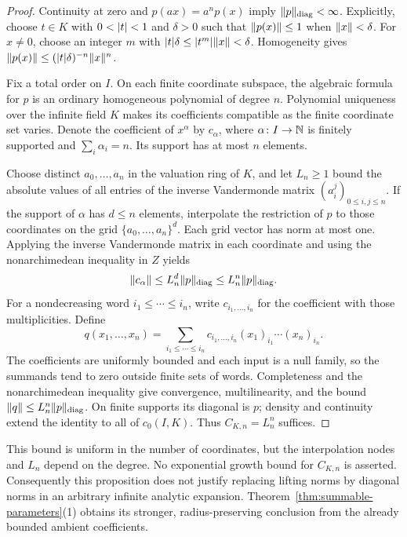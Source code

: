 \begin{proof}
Continuity at zero and $p(ax)=a^np(x)$ imply $\lVert p\rVert_{\mathrm{diag}}<\infty$.
Explicitly, choose $t\in K$ with $0<\lvert t\rvert<1$ and $\delta>0$ such that $\lVert p(x)\rVert\le1$
when $\lVert x\rVert<\delta$. For $x\ne0$, choose an integer $m$ with
$\lvert t\rvert\delta\le\lvert t^m\rvert\lVert x\rVert<\delta$. Homogeneity gives
$\lVert p(x)\rVert\le(\lvert t\rvert\delta)^{-n}\lVert x\rVert^n$.

Fix a total order on $I$. On each finite coordinate subspace, the algebraic formula for $p$ is an
ordinary homogeneous polynomial of degree $n$. Polynomial uniqueness over the infinite field $K$
makes its coefficients compatible as the finite coordinate set varies. Denote the coefficient of
$x^\alpha$ by $c_\alpha$, where $\alpha\colon I\to\mathbb N$ is finitely supported and $\sum_i\alpha_i=n$.
Its support has at most $n$ elements.

Choose distinct $a_0,\ldots,a_n$ in the valuation ring of $K$, and let $L_n\ge1$ bound the absolute
values of all entries of the inverse Vandermonde matrix $(a_i^j)_{0\le i,j\le n}$.
If the support of $\alpha$ has $d\le n$ elements, interpolate the restriction of $p$ to those
coordinates on the grid $\{a_0,\ldots,a_n\}^d$. Each grid vector has norm at most one. Applying the
inverse Vandermonde matrix in each coordinate and using the nonarchimedean inequality in $Z$ yields
\[
 \lVert c_\alpha\rVert\le L_n^d\lVert p\rVert_{\mathrm{diag}}
 \le L_n^n\lVert p\rVert_{\mathrm{diag}}.
\]
For a nondecreasing word $i_1\le\cdots\le i_n$, write $c_{i_1,\ldots,i_n}$ for the coefficient
with those multiplicities. Define
\[
 q(x_1,\ldots,x_n)=
 \sum_{i_1\le\cdots\le i_n}
 c_{i_1,\ldots,i_n}(x_1)_{i_1}\cdots(x_n)_{i_n}.
\]
The coefficients are uniformly bounded and each input is a null family, so the summands tend to zero
outside finite sets of words. Completeness and the nonarchimedean inequality give convergence,
multilinearity, and the bound $\lVert q\rVert\le L_n^n\lVert p\rVert_{\mathrm{diag}}$.
On finite supports its diagonal is $p$; density and continuity extend the identity to all of $c_0(I,K)$.
Thus $C_{K,n}=L_n^n$ suffices.
\end{proof}

This bound is uniform in the number of coordinates, but the interpolation nodes and $L_n$ depend on
the degree. No exponential growth bound for $C_{K,n}$ is asserted. Consequently this proposition does
not justify replacing lifting norms by diagonal norms in an arbitrary infinite analytic expansion.
Theorem~\ref{thm:summable-parameters}(1) obtains its stronger, radius-preserving conclusion from the
already bounded ambient coefficients.



